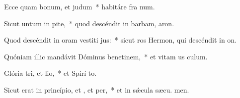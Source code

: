 \item Ecce quam bonum, et  judum~* habitáre fra  num.
\item Sicut untum in pite,~* quod descéndit in barbam,  aron.
\item Quod descéndit in oram vestiti jus:~* sicut ros Hermon, qui descéndit in  on.
\item Quóniam illic mandávit Dóminus benetinem,~* et vitam us  culum.
\item Glória tri, et lio,~* et Spirí to.
\item Sicut erat in princípio, et , et per,~* et in sǽcula sæcu. men.

